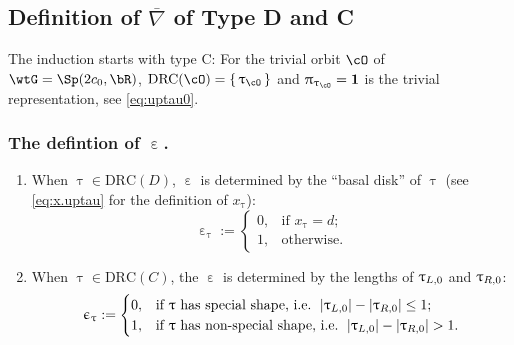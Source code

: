 \documentclass[12pt,a4paper]{amsart}
\newcommand{\bfone}{\mathbf{1}}
\def\abs#1{\left|{#1}\right|}
\def\eDD{\overline{\nabla}}
\numberwithin{equation}{section}
\theoremstyle{remark}
\def\drc{\mathrm{DRC}}
\def\uptaup{\uptau^{\prime}}
\begin{document}
\subsection{Definition of $\eDD$ of Type D and C} \label{sec:alg.CD}

The induction starts with type C: For the trivial orbit $\cO$ of
$\wtG = \Sp(2c_{0},\bR)$, $\drc(\cO) = \set{\uptau_{\cO}}$ and
$\uppi_{\uptau_{\cO}}=\bfone$ is the trivial representation, see \eqref{eq:uptau0}.

\subsubsection{The defintion of $\upepsilon$.} \label{sec:upepsilon}
\begin{enumerate}[label=(\arabic*).,series=alg1]
  \item When $\uptau\in \drc(D)$, $\upepsilon$ is determined by the ``basal
  disk'' of $\uptau$ (see \eqref{eq:x.uptau} for the definition of $x_{\uptau}$):%
  \[
    \upepsilon_{\uptau}:=
    \begin{cases}
      0, & \text{if $x_{\uptau}=d$;} \\
      1, & \text{otherwise.}
    \end{cases}
  \]
  \item When $\uptau\in \drc(C)$, the  $\upepsilon$  is determined by
  the lengths of $\uptau_{L,0}$ and $\uptau_{R,0}$:
  \[
    \upepsilon_{\uptau} :=
    \begin{cases}
      0, & \text{if $\uptau$ has special shape, i.e. } \abs{\taulf}-\abs{\taurf} \leq  1;\\
      1, & \text{if $\uptau$ has non-special shape, i.e. }\abs{\taulf} - \abs{\taurf}> 1.
    \end{cases}
  \]
\end{enumerate}

\medskip

\end{document}
